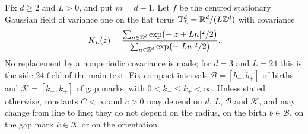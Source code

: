 \begin{definition}\label{def:parent-model}
Fix $d\ge2$ and $L>0$, and put $m=d-1$. Let $f$ be the centred stationary Gaussian field of variance one on the flat torus $\mathbb T^d_L=\mathbb R^d/(L\mathbb Z^d)$ with covariance
\begin{equation}\label{eq:parent-KL}
K_L(z)=\frac{\sum_{n\in\mathbb Z^d}\exp\bigl(-|z+Ln|^2/2\bigr)}{\sum_{n\in\mathbb Z^d}\exp\bigl(-|Ln|^2/2\bigr)} .
\end{equation}
No replacement by a nonperiodic covariance is made; for $d=3$ and $L=24$ this is the side-$24$ field of the main text. Fix compact intervals $\mathcal B=[b_-,b_+]$ of births and $\mathcal K=[k_-,k_+]$ of gap marks, with $0<k_-\le k_+<\infty$. Unless stated otherwise, constants $C<\infty$ and $c>0$ may depend on $d$, $L$, $\mathcal B$ and $\mathcal K$, and may change from line to line; they do not depend on the radius, on the birth $b\in\mathcal B$, on the gap mark $k\in\mathcal K$ or on the orientation.
\end{definition}

